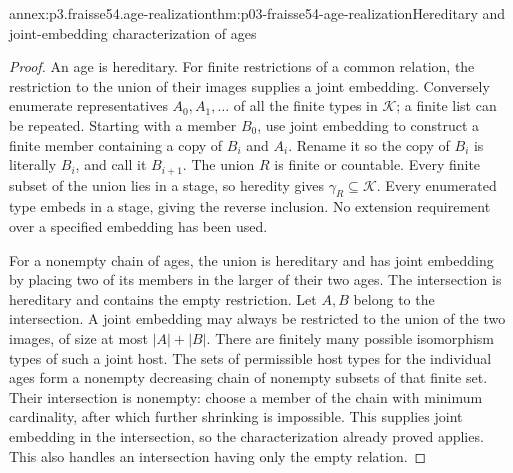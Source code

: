 \begin{annexitem}{annex:p3.fraisse54.age-realization}{thm:p03-fraisse54-age-realization}{Hereditary and joint-embedding characterization of ages}
\begin{proof}
An age is hereditary. For finite restrictions of a common relation, the
restriction to the union of their images supplies a joint embedding.
Conversely enumerate representatives \(A_0,A_1,\ldots\) of all the finite
types in \(\mathcal K\); a finite list can be repeated. Starting with a
member \(B_0\), use joint embedding to construct a finite member containing
a copy of \(B_i\) and \(A_i\). Rename it so the copy of \(B_i\) is
literally \(B_i\), and call it \(B_{i+1}\). The union \(R\) is finite
or countable. Every finite subset of the union lies in a stage, so heredity
gives \(\gamma_R\subseteq\mathcal K\). Every enumerated type embeds in
a stage, giving the reverse inclusion. No extension requirement over a
specified embedding has been used.

For a nonempty chain of ages, the union is hereditary and has joint
embedding by placing two of its members in the larger of their two ages.
The intersection is hereditary and contains the empty restriction. Let
\(A,B\) belong to the intersection. A joint embedding may always be
restricted to the union of the two images, of size at most
\(\lvert A\rvert+\lvert B\rvert\). There are finitely many possible
isomorphism types of such a joint host. The sets of permissible host types
for the individual ages form a nonempty decreasing chain of nonempty subsets
of that finite set. Their intersection is nonempty: choose a member of the
chain with minimum cardinality, after which further shrinking is impossible.
This supplies joint embedding in the intersection, so the characterization
already proved applies. This also handles an intersection having only the
empty relation.
\end{proof}
\end{annexitem}

